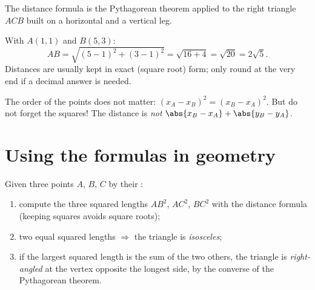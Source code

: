 \begin{omfigure}

{\small The distance formula is the Pythagorean theorem applied to the
right triangle $ACB$ built on a horizontal and a vertical leg.}
\end{omfigure}

\begin{example}\label{ex:g10:coordgeom:distance}
With $A(1, 1)$ and $B(5, 3)$:
\[
AB = \sqrt{(5-1)^2 + (3-1)^2} = \sqrt{16 + 4} = \sqrt{20} = 2\sqrt 5 .
\]
Distances are usually kept in exact (square root) form; only round at the
very end if a decimal answer is needed.
\end{example}

\begin{remark}
The order of the points does not matter: $(x_A - x_B)^2 =
(x_B - x_A)^2$. But do not forget the squares! The distance is
\emph{not} $\abs{x_B - x_A} + \abs{y_B - y_A}$.
\end{remark}

\section{Using the formulas in geometry}

\begin{method}\label{met:g10:coordgeom:triangle}
Given three points $A$, $B$, $C$ by their :
\begin{enumerate}
  \item compute the three squared lengths $AB^2$, $AC^2$, $BC^2$ with the
        distance formula (keeping squares avoids square roots);
  \item two equal squared lengths $\Rightarrow$ the triangle is
        \emph{isosceles};
  \item if the largest squared length is the sum of the two others, the
        triangle is \emph{right-angled} at the vertex opposite the longest
        side, by the converse of the Pythagorean theorem.
\end{enumerate}
\end{method}

